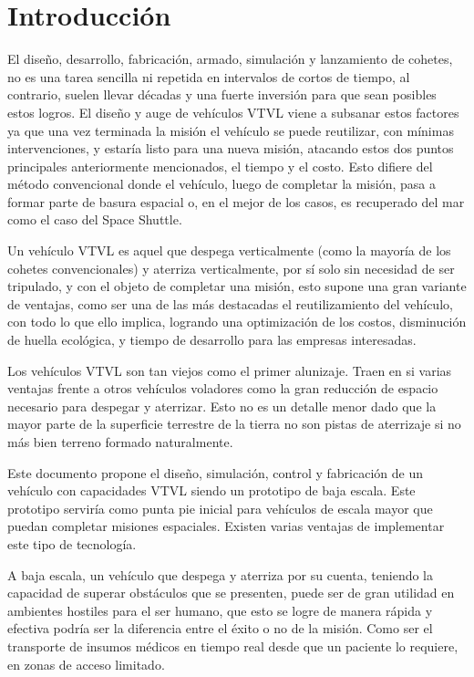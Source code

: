 
\section{Introducción}
El diseño, desarrollo, fabricación, armado, simulación y lanzamiento de cohetes, no es una tarea
sencilla ni repetida en intervalos de cortos de tiempo, al contrario, suelen llevar décadas y una
fuerte inversión para que sean posibles estos logros. El diseño y auge de vehículos VTVL viene
a subsanar estos factores ya que una vez terminada la misión el vehículo se puede reutilizar,
con mínimas intervenciones, y estaría listo para una nueva misión, atacando estos dos puntos principales anteriormente mencionados, el tiempo y el costo. Esto difiere del método convencional donde el vehículo, luego de completar la misión, pasa a formar parte de basura espacial o, en el mejor de los casos, es recuperado del mar como el caso del Space Shuttle. 

\medskip

Un vehículo VTVL es aquel que despega verticalmente (como la mayoría de los cohetes
convencionales) y aterriza verticalmente, por sí solo sin necesidad de ser tripulado, y con el
objeto de completar una misión, esto supone una gran variante de ventajas, como ser una de
las más destacadas el reutilizamiento del vehículo, con todo lo que ello implica, logrando una
optimización de los costos, disminución de huella ecológica, y tiempo de desarrollo para las empresas interesadas. %

\medskip

Los vehículos VTVL son tan viejos como el primer alunizaje. Traen en si varias ventajas frente a otros vehículos voladores como la gran reducción de espacio necesario para despegar y aterrizar. Esto no es un detalle menor dado que la mayor parte de la superficie terrestre de la tierra no son pistas de aterrizaje si no más bien terreno formado naturalmente.

\medskip

Este documento propone el diseño, simulación, control y fabricación de un vehículo con capacidades VTVL siendo un prototipo de baja escala. 
Este prototipo serviría como punta pie inicial
para vehículos de escala mayor que puedan completar misiones espaciales. Existen varias ventajas de implementar este tipo de tecnología.

\medskip

A baja escala, un vehículo que despega y aterriza por su cuenta, teniendo la capacidad de
superar obstáculos que se presenten, puede ser de gran utilidad en ambientes hostiles para el
ser humano, que esto se logre de manera rápida y efectiva podría ser la diferencia entre el
éxito o no de la misión.
Como ser el transporte de insumos médicos en tiempo real desde que un paciente lo requiere,
en zonas de acceso limitado.

